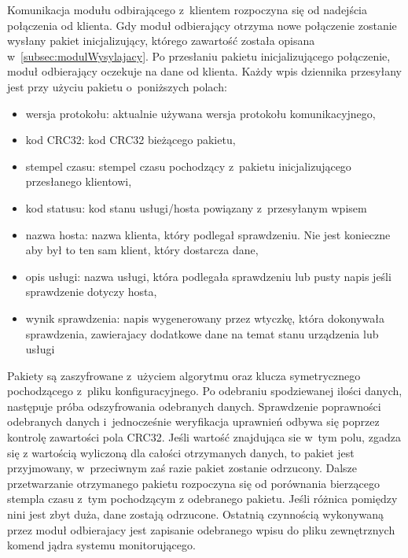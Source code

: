 Komunikacja modułu odbirającego z~klientem rozpoczyna się od nadejścia
połączenia od klienta. Gdy moduł odbierający otrzyma nowe połączenie
zostanie wysłany pakiet inicjalizujący, którego zawartość została
opisana w~\ref{subsec:modulWysylajacy}. Po przesłaniu pakietu
inicjalizującego połączenie, moduł odbierający oczekuje na dane od
klienta. Każdy wpis dziennika przesyłany jest przy użyciu pakietu
o~poniższych polach:

\begin{itemize}
\item wersja protokołu: aktualnie używana wersja protokołu komunikacyjnego,
\item kod CRC32: kod CRC32 bieżącego pakietu,
\item stempel czasu: stempel czasu pochodzący z~pakietu
  inicjalizującego przesłanego klientowi,
\item kod statusu: kod stanu usługi/hosta powiązany z~przesyłanym wpisem
\item nazwa hosta: nazwa klienta, który podlegał sprawdzeniu. Nie jest
  konieczne aby był to ten sam klient, który dostarcza dane,
\item opis usługi: nazwa usługi, która podlegała sprawdzeniu lub pusty
  napis jeśli sprawdzenie dotyczy hosta,
\item wynik sprawdzenia: napis wygenerowany przez wtyczkę, która
  dokonywała sprawdzenia, zawierajacy dodatkowe dane na temat stanu
  urządzenia lub usługi
\end{itemize}

Pakiety są zaszyfrowane z~użyciem algorytmu oraz klucza symetrycznego
pochodzącego z~pliku konfiguracyjnego. Po odebraniu spodziewanej
ilości danych, następuje próba odszyfrowania odebranych
danych. Sprawdzenie poprawności odebranych danych i~jednocześnie
weryfikacja uprawnień odbywa się poprzez kontrolę zawartości pola
CRC32. Jeśli wartość znajdująca sie w~tym polu, zgadza się z wartością
wyliczoną dla całości otrzymanych danych, to pakiet jest przyjmowany,
w~przeciwnym zaś razie pakiet zostanie odrzucony. Dalsze przetwarzanie
otrzymanego pakietu rozpoczyna się od porównania bierzącego stempla
czasu z~tym pochodzącym z odebranego pakietu. Jeśli różnica pomiędzy
nini jest zbyt duża, dane zostają odrzucone. Ostatnią czynnością
wykonywaną przez moduł odbierajacy jest zapisanie odebranego wpisu do
pliku zewnętrznych komend jądra systemu monitorującego.

